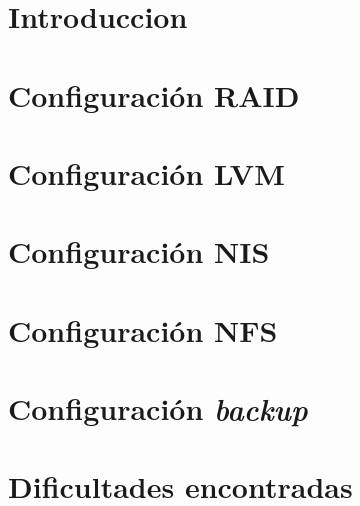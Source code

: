\documentclass[11pt, spanish, a4paper, hidelinks]{article}
\begin{document}
    \maketitle
    
    \tableofcontents

    \section{Introduccion}
    

    \section{Configuración RAID}
    
    
    \section{Configuración LVM}
    
    
    \section{Configuración NIS}
    
    
    \section{Configuración NFS}
    

    \section{Configuración \textit{backup}}
    

    \section{Dificultades encontradas}
    
\end{document}
